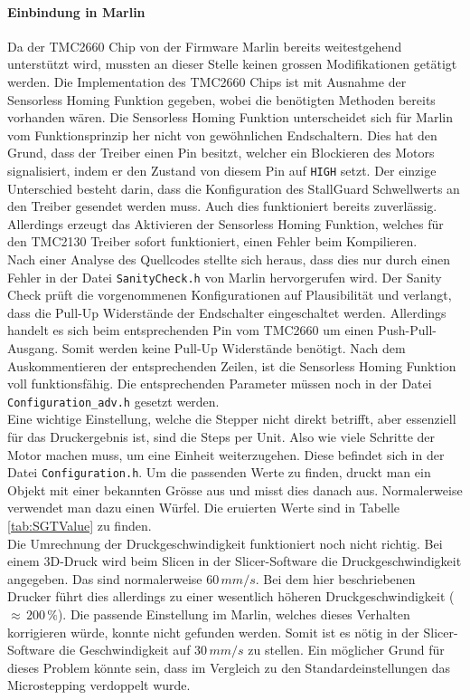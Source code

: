 \paragraph{Einbindung in Marlin}
Da der TMC2660 Chip von der Firmware Marlin bereits weitestgehend unterstützt wird, mussten an dieser Stelle keinen grossen Modifikationen getätigt werden. Die Implementation des TMC2660 Chips ist mit Ausnahme der Sensorless Homing Funktion gegeben, wobei die benötigten Methoden bereits vorhanden wären.
Die Sensorless Homing Funktion unterscheidet sich für Marlin vom Funktionsprinzip her nicht von gewöhnlichen Endschaltern. Dies hat den Grund, dass der Treiber einen Pin besitzt, welcher ein Blockieren des Motors signalisiert, indem er den Zustand von diesem Pin auf \texttt{HIGH} setzt. Der einzige Unterschied besteht darin, dass die Konfiguration des StallGuard Schwellwerts an den Treiber gesendet werden muss. Auch dies funktioniert bereits zuverlässig. Allerdings erzeugt das Aktivieren der Sensorless Homing Funktion, welches für den TMC2130 Treiber sofort funktioniert, einen Fehler beim Kompilieren.\\
Nach einer Analyse des Quellcodes stellte sich heraus, dass dies nur durch einen Fehler in der Datei \texttt{SanityCheck.h} von Marlin hervorgerufen wird. Der Sanity Check prüft die vorgenommenen Konfigurationen auf Plausibilität und verlangt, dass die Pull-Up Widerstände der Endschalter eingeschaltet werden. Allerdings handelt es sich beim entsprechenden Pin vom TMC2660 um einen Push-Pull-Ausgang. Somit werden keine Pull-Up Widerstände benötigt. Nach dem Auskommentieren der entsprechenden Zeilen, ist die Sensorless Homing Funktion voll funktionsfähig. Die entsprechenden Parameter müssen noch in der Datei \texttt{Configuration\_adv.h} gesetzt werden.\\

Eine wichtige Einstellung, welche die Stepper nicht direkt betrifft, aber essenziell für das Druckergebnis ist, sind die Steps per Unit. Also wie viele Schritte der Motor machen muss, um eine Einheit weiterzugehen. Diese befindet sich in der Datei \texttt{Configuration.h}. Um die passenden Werte zu finden, druckt man ein Objekt mit einer bekannten Grösse aus und misst dies danach aus. Normalerweise verwendet man dazu einen Würfel. Die eruierten Werte sind in Tabelle \ref{tab:SGTValue} zu finden.\\

Die Umrechnung der Druckgeschwindigkeit funktioniert noch nicht richtig. Bei einem 3D-Druck wird beim Slicen in der Slicer-Software die Druckgeschwindigkeit angegeben. Das sind normalerweise $60\,\si{mm/s}$. Bei dem hier beschriebenen Drucker führt dies allerdings zu einer wesentlich höheren Druckgeschwindigkeit ($\approx\, 200\,\%$). Die passende Einstellung im Marlin, welches dieses Verhalten korrigieren würde, konnte nicht gefunden werden. Somit ist es nötig in der Slicer-Software die Geschwindigkeit auf $30\,\si{mm/s}$ zu stellen. Ein möglicher Grund für dieses Problem könnte sein, dass im Vergleich zu den Standardeinstellungen das Microstepping verdoppelt wurde.

